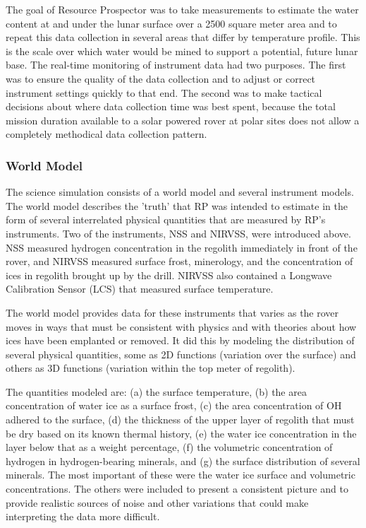 \documentclass[twocolumn,letterpaper]{IEEEAerospaceCLS}  %
\begin{document}
The goal of Resource Prospector was to take measurements to estimate the water content at and under the lunar surface over a 2500 square meter area and to repeat this data collection in several areas that differ by temperature profile.  
This is the scale over which water would be mined to support a potential, future lunar base.  
The real-time monitoring of instrument data had two purposes.  
The first was to ensure the quality of the data collection and to adjust or correct instrument settings quickly to that end.  
The second was to make tactical decisions about where data collection time was best spent, because the total mission duration available to a solar powered rover at polar sites does not allow a completely methodical data collection pattern.

\subsubsection{World Model}
The science simulation consists of a world model and several instrument models.  
The world model describes the 'truth' that RP was intended to estimate in the form of several interrelated physical quantities that are measured by RP's instruments.  
Two of the instruments, NSS and NIRVSS, were introduced above.  
NSS measured hydrogen concentration in the regolith immediately in front of the rover, and NIRVSS measured surface frost, minerology, and the concentration of ices in regolith brought up by the drill.  
NIRVSS also contained a Longwave Calibration Sensor (LCS) that measured surface temperature.

The world model provides data for these instruments that varies as the rover moves in ways that must be consistent with physics and with theories about how ices have been emplanted or removed.  
It did this by modeling the distribution of several physical quantities, some as 2D functions (variation over the surface) and others as 3D functions (variation within the top meter of regolith).

The quantities modeled are: (a) the surface temperature, (b) the area concentration of water ice as a surface frost, (c) the area concentration of OH adhered to the surface, (d) the thickness of the upper layer of regolith that must be dry based on its known thermal history, (e) the water ice concentration in the layer below that as a weight percentage, (f) the volumetric concentration of hydrogen in hydrogen-bearing minerals, and (g) the surface distribution of several minerals.  
The most important of these were the water ice surface and volumetric concentrations.  
The others were included to present a consistent picture and to provide realistic sources of noise and other variations that could make interpreting the data more difficult.
\end{document}
